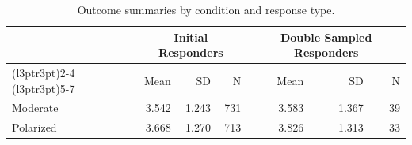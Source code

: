 \begin{table}

\caption{Outcome summaries by condition and response type.}
\centering
\begin{tabular}[t]{lrrrrrr}
\toprule
\multicolumn{1}{c}{ } & \multicolumn{3}{c}{Initial Responders} & \multicolumn{3}{c}{Double Sampled Responders} \\
\cmidrule(l{3pt}r{3pt}){2-4} \cmidrule(l{3pt}r{3pt}){5-7}
 & Mean & SD & N & Mean & SD & N\\
\midrule
Moderate & 3.542 & 1.243 & 731 & 3.583 & 1.367 & 39\\
Polarized & 3.668 & 1.270 & 713 & 3.826 & 1.313 & 33\\
\bottomrule
\end{tabular}
\end{table}
